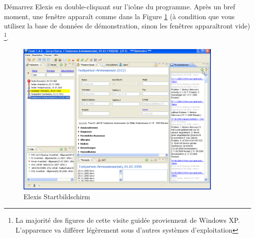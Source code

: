 
Démarrez Elexis en double-cliquant sur l'icône du programme. Après un bref
moment, une fenêtre apparaît comme dans la Figure  \ref{fig:startbild} (à condition que vous utilisez la base de données de démonstration, sinon les fenêtres apparaîtront vide) \footnote{La majorité des figures de cette visite guidée proviennent de Windows XP. L'apparence va différer légèrement sous d'autres systèmes d'exploitation}.
 \begin{figure}[ht]
    \center
	\includegraphics[width=0.9\textwidth]{images/einf0}
	\caption{Elexis Startbildschirm}
	\label{fig:startbild}
\end{figure}
